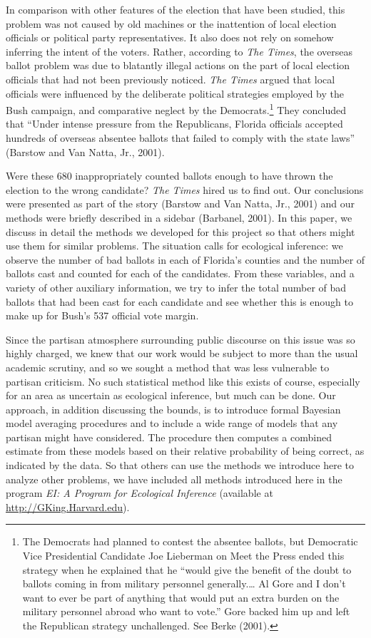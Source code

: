 \documentclass[11pt,titlepage]{article}
\begin{document}
In comparison with other features of the election that have been
studied, this problem was not caused by old machines or the
inattention of local election officials or political party
representatives.  It also does not rely on somehow inferring the
intent of the voters.  Rather, according to \emph{The Times}, the
overseas ballot problem was due to blatantly illegal actions on the
part of local election officials that had not been previously noticed.
\emph{The Times} argued that local officials were influenced by the
deliberate political strategies employed by the Bush campaign, and
comparative neglect by the Democrats.\footnote{The Democrats had
  planned to contest the absentee ballots, but Democratic Vice
  Presidential Candidate Joe Lieberman on Meet the Press ended this
  strategy when he explained that he ``would give the benefit of the
  doubt to ballots coming in from military personnel generally.\ldots
  Al Gore and I don't want to ever be part of anything that would put
  an extra burden on the military personnel abroad who want to vote.''
  Gore backed him up and left the Republican strategy unchallenged.
  See Berke (2001).}  They concluded that ``Under intense pressure
from the Republicans, Florida officials accepted hundreds of overseas
absentee ballots that failed to comply with the state laws'' (Barstow
and Van Natta, Jr., 2001)\nocite{BarVan01}.

Were these 680 inappropriately counted ballots enough to have thrown
the election to the wrong candidate?  \emph{The Times} hired us to
find out.  Our conclusions were presented as part of the story
(Barstow and Van Natta, Jr., 2001) and our methods were briefly
described in a sidebar (Barbanel, 2001)\nocite{Barbanel01}.  In this
paper, we discuss in detail the methods we developed for this project
so that others might use them for similar problems.  The situation
calls for ecological inference: we observe the number of bad ballots
in each of Florida's counties and the number of ballots cast and
counted for each of the candidates.  From these variables, and a
variety of other auxiliary information, we try to infer the total
number of bad ballots that had been cast for each candidate and see
whether this is enough to make up for Bush's 537 official vote margin.

Since the partisan atmosphere surrounding public discourse on this
issue was so highly charged, we knew that our work would be subject to
more than the usual academic scrutiny, and so we sought a method that
was less vulnerable to partisan criticism.  No such statistical method
like this exists of course, especially for an area as uncertain as
ecological inference, but much can be done.  Our approach, in addition
discussing the bounds, is to introduce formal Bayesian model averaging
procedures and to include a wide range of models that any partisan
might have considered.  The procedure then computes a combined
estimate from these models based on their relative probability of
being correct, as indicated by the data.  So that others can use the
methods we introduce here to analyze other problems, we have included
all methods introduced here in the program \emph{EI: A Program for
  Ecological Inference} (available at \url{http://GKing.Harvard.edu}).
\end{document}
